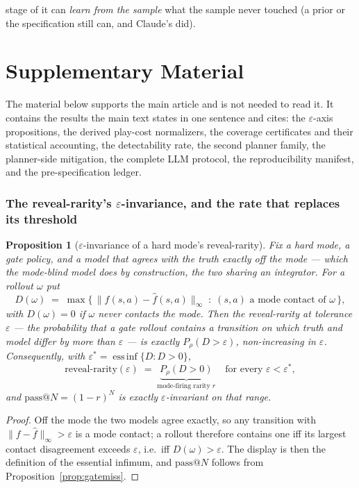 \documentclass[11pt]{article}
\newtheorem{proposition}{Proposition}
\theoremstyle{definition}
\theoremstyle{remark}
\begin{document}
stage of it can \emph{learn from the sample} what the sample never touched (a prior or the specification still can, and Claude's did).


\appendix

\part*{Supplementary Material}

\noindent The material below supports the main article and is not needed to read it. It
contains the results the main text states in one sentence and cites: the $\varepsilon$-axis
propositions, the derived play-cost normalizers, the coverage certificates and their
statistical accounting, the detectability rate, the second planner family, the planner-side
mitigation, the complete LLM protocol, the reproducibility manifest, and the
pre-specification ledger.

\section{The reveal-rarity's \texorpdfstring{$\varepsilon$}{eps}-invariance, and the rate that replaces its threshold}
\label{sup:epsflat}

\begin{proposition}[$\varepsilon$-invariance of a hard mode's reveal-rarity]
\label{prop:epsinv}
Fix a hard mode, a gate policy, and a model that agrees with the truth \emph{exactly} off the mode --- which the mode-blind model does by construction, the two sharing an integrator. For a rollout $\omega$ put
\[
  D(\omega) \;=\; \max\{\,\|f(s,a) - \hat f(s,a)\|_\infty \;:\; (s,a) \text{ a mode contact of } \omega\,\},
\]
with $D(\omega) = 0$ if $\omega$ never contacts the mode. Then the reveal-rarity at tolerance $\varepsilon$ --- the probability that a gate rollout contains a transition on which truth and model differ by more than $\varepsilon$ --- is exactly $P_\rho(D > \varepsilon)$, non-increasing in $\varepsilon$. Consequently, with $\varepsilon^\ast = \operatorname*{ess\,inf}\{D : D > 0\}$,
\[
  \text{reveal-rarity}(\varepsilon) \;=\; \underbrace{P_\rho(D > 0)}_{\text{mode-firing rarity } r} \quad\text{for every } \varepsilon < \varepsilon^\ast,
\]
and $\mathrm{pass@}N = (1-r)^N$ is \emph{exactly} $\varepsilon$-invariant on that range.
\end{proposition}

\begin{proof}
Off the mode the two models agree exactly, so any transition with $\|f - \hat f\|_\infty > \varepsilon$ is a mode contact; a rollout therefore contains one iff its largest contact disagreement exceeds $\varepsilon$, i.e.\ iff $D(\omega) > \varepsilon$. The display is then the definition of the essential infimum, and $\mathrm{pass@}N$ follows from Proposition~\ref{prop:gatemiss}.
\end{proof}
\end{document}
